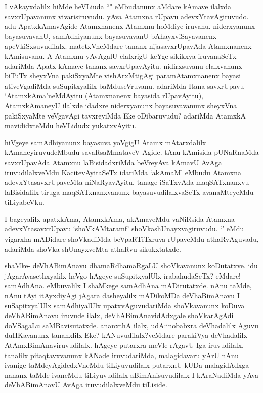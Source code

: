 \begin{artha}
I vAkayxdalilx hiMde heVLiuda ``\stext " eMbudanunx aMdare kAmave ilalxda savxrUpavanunx vivarisiruvudu. yAva Atamxna rUpavu adevxYtavAgiruvudo. adu ApatxkAmavAgide Atamxnanenx Atamxnu hoMdiye iruvanu. niderxyanunx bayasuvavanU, samAdhiyanunx bayasuvavanU bAhayxviSayavanenx apeVkiSxsuvudilalx. matetxVneMdare tananx nijasavxrUpavAda Atamxnanenx kAmisuvanu. A Atamxnu yAvAgalU elalxrigU keYge sikikxya iruvanaSeTx adariMda Apatx kAmave tananx savxrUpavAyitu. nidirxsuvanu elalxvanunx biTuTx sheyxVna pakiSxyaMte vishArxMtigAgi paramAtamxnanenx bayasi ativeVgadiMda suSupitxyalilx baMduseVruvanu. adariMda Itana savxrUpavu `AtamxkAma'neMdAyitu (Atamxnanenx bayasida rUpavAyitu), AtamxkAmaneyU ilalxde idadxre niderxyanunx bayasuvavanunx sheyxVna pakiSxyaMte veVgavAgi tavxreyiMda Eke oDibaruvudu? adariMda AtamxkA mavididxteMdu heVLidudx yukatxvAyitu. 
\end{artha}%

\begin{artha}
hiVgeye samAdhiyanunx bayasuva yoVgigU Atamx mAtarxdalilx kAmaneyiruvudeMbudu savaRsaMmataveV Agide. tAnu kAmisida pUNaRnaMda savxrUpavAda Atamxnu laBisidadxriMda beVreyAva kAmavU AvAga iruvudilalxveMdu KacitevAyitaSeTx idariMda `akAmaM' eMbudu Atamxna adevxYtasavxrUpaveMta niNaRyavAyitu, tanage iSaTxvAda maqSATxnanxvu laBisidalilx tiruga maqSATxnanxvanunx bayasuvudilalxvaSeTx avanaMteyeMdu tiLiyabeVku.
\end{artha}

\begin{artha}
I bageyalilx apatxkAma, AtamxkAma, akAmaveMdu vaNiRsida Atamxna adevxYtasavxrUpavu `shoVkAMtaramf' shoVkashUnayxvagiruvudu. `\stext ' eMdu vigarxha mADidare shoVkadiMda beVpaRTiTxruva rUpaveMdu athaRvAguvadu, adariMda shoVka shUnayxveMta athaRvu sikukxtatxde. 
\end{artha}

\begin{artha}
shaMke- deVhABimAnavu dhamaRdhamaRgaLU shoVkavanunx koDutatxve. idu jAgarAvasethxyalilx heVgo hAgeye suSupitxyalUlx irabahudaSeTx? eMdare! samAdhAna. \stext eMbuvalilx I shaMkege samAdhAna mADirutatxde. nAnu taMde, nAnu tAyi itAyxdiyAgi jAgara dasheyalilx mADikoMDa deVhaBimAnavu I suSapitxyalUlx samAdhiyalUlx upatxvAguvudariMda shoVkavanunx koDuva deVhABimAnavu iruvude ilalx, deVhABimAnavidAdxgale shoVkarAgAdi doVSagaLu saMBavisutatxde. ananxthA ilalx, udA:inobabxra deVhadalilx Aguvu duHKavanunx tananxlilx Eke? kANuvudilalx?veMdare parakiVya deVhadalilx AtAmxBimAnaviruvudilalx. hAgeye putarxra meVle rAgavU Iga iruvudilalx, tanalilx pitaqtavxvanunx kANade iruvudariMda, malagidavaru yArU nAnu ivanige taMdeyAgidedxVneMdu tiLiyuvudilalx putarxnU kUDa malagidAdxga nananx taMde ivaneMdu tiLiyuvudilalx aBimAnisuvudilalx I kAraNadiMda yAva deVhABimAnavU AvAga iruvudilalxveMdu tiLiside.
\end{artha}%

